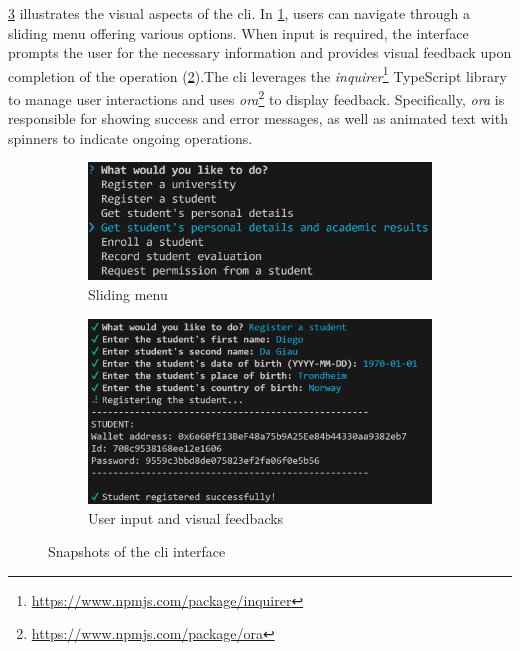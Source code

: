 \cref{fig:clifigs} illustrates the visual aspects of the \acrshort{cli}. In \cref{sfig:cliDesign1}, users can navigate through a sliding menu offering various options. When input is required, the interface prompts the user for the necessary information and provides visual feedback upon completion of the operation (\cref{sfig:cliDesign2}).The \acrshort{cli} leverages the \textit{inquirer}\footnote{\url{https://www.npmjs.com/package/inquirer}} TypeScript library to manage user interactions and uses \textit{ora}\footnote{\url{https://www.npmjs.com/package/ora}} to display feedback. Specifically, \textit{ora} is responsible for showing success and error messages, as well as animated text with spinners to indicate ongoing operations.

\begin{figure}
    \centering
    \begin{subfigure}{.5\textwidth}
        \centering
        \includegraphics[width=\textwidth]{figures/CLI screen 1.png}
        \caption{Sliding menu}
        \label{sfig:cliDesign1}
    \end{subfigure}
    \hfill
    \begin{subfigure}{.60\textwidth}
        \centering
        \includegraphics[width=\textwidth]{figures/CLI screen 2.png}
        \caption{User input and visual feedbacks}
        \label{sfig:cliDesign2}
    \end{subfigure}
    \caption[Different aspects of the \acrshort{cli} interface.]{Snapshots of the \acrshort{cli} interface}
    \label{fig:clifigs}
\end{figure}


